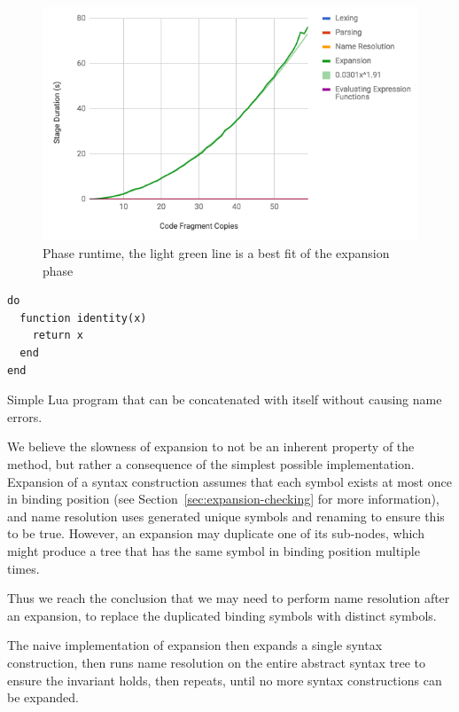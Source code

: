 \documentclass{kththesis}
\begin{document}
\begin{figure}[t]
\includegraphics[width=\textwidth]{resources/performance-graph-with-expansion}
\caption{Phase runtime, the light green line is a best fit of the expansion phase}
\label{fig:performance-graph-with-expansion}
\end{figure}

\begin{listing}[t]
\begin{verbatim}
do
  function identity(x)
    return x
  end
end
\end{verbatim}
\caption{Simple Lua program that can be concatenated with itself without causing name errors.}
\label{lst:lua-fragment}
\end{listing}

We believe the slowness of expansion to not be an inherent property of the method, but rather a consequence of the simplest possible implementation. Expansion of a syntax construction assumes that each symbol exists at most once in binding position (see Section~\ref{sec:expansion-checking} for more information), and name resolution uses generated unique symbols and renaming to ensure this to be true. However, an expansion may duplicate one of its sub-nodes, which might produce a tree that has the same symbol in binding position multiple times.

Thus we reach the conclusion that we may need to perform name resolution after an expansion, to replace the duplicated binding symbols with distinct symbols.

The naive implementation of expansion then expands a single syntax construction, then runs name resolution on the entire abstract syntax tree to ensure the invariant holds, then repeats, until no more syntax constructions can be expanded.
\end{document}
